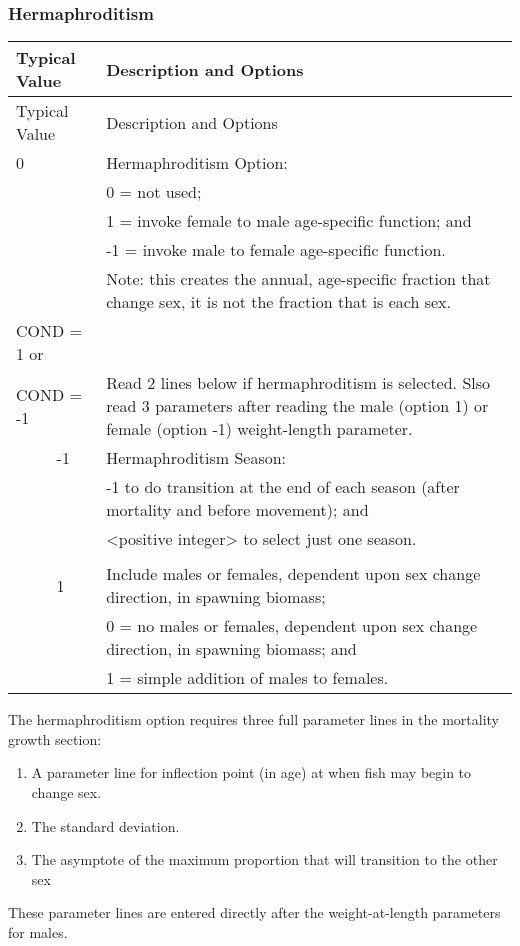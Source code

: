 \subsubsection{Hermaphroditism}

\begin{longtable}{p{0.5cm} p{2cm} p{13cm}}
	\hline	
	\multicolumn{2}{l}{Typical Value} & Description and Options\Tstrut\Bstrut\\
	\hline
	\endfirsthead

	\hline
	\multicolumn{2}{l}{Typical Value} & Description and Options\Tstrut\Bstrut\\
	\hline
	\endhead
	\hline

	\endfoot
	
	\endlastfoot

	0 & & Hermaphroditism Option:\Tstrut\\
	 &  & 0 = not used; \\
	 &  & 1 = invoke female to male age-specific function; and \\
	 &  & -1 = invoke male to female age-specific function. \\
	 &  & Note:  this creates the annual, age-specific fraction that change sex, it is not the fraction that is each sex.\Bstrut\\
	\hline

	\multicolumn{2}{l}{COND = 1 or} \Tstrut & \\
	\multicolumn{2}{l}{COND = -1}  & Read 2 lines below if hermaphroditism is selected. Slso read 3 parameters after reading the male (option 1) or female (option -1) weight-length parameter.\Bstrut\\
	& -1 & Hermaphroditism Season: \\
	&    & -1 to do transition at the end of each season (after mortality and before movement); and\\
	&    & <positive integer> to select just one season.\\
	\\
	& 1  & Include males or females, dependent upon sex change direction, in spawning biomass;  \\
	&    & 0 = no males or females, dependent upon sex change direction, in spawning biomass; and \\
	&    & 1 = simple addition of males to females. \Bstrut\\
	\hline
\end{longtable}

The hermaphroditism option requires three full parameter lines in the mortality growth section: 
\begin{enumerate}
	\item A parameter line for inflection point (in age) at when fish may begin to change sex.
	\item The standard deviation.
	\item The asymptote of the maximum proportion that will transition to the other sex
\end{enumerate}
These parameter lines are entered directly after the weight-at-length parameters for males.


